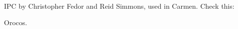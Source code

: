 
IPC by Christopher Fedor and Reid Simmons, used in Carmen.
Check this: \cite{roy03IROS}

Orocos.
\cite{soetens05orocos}